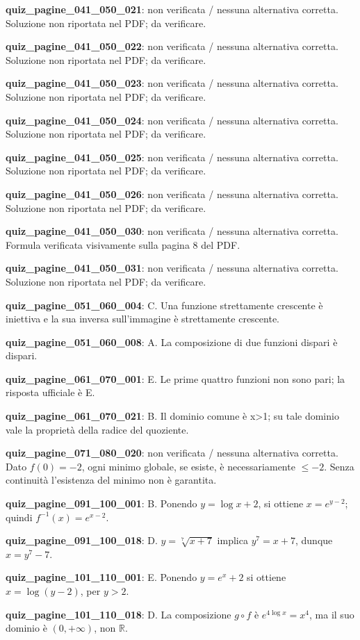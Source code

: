 \documentclass[11pt,a4paper]{article}
\newcounter{quiz}
\begin{document}
\noindent\textbf{quiz\_pagine\_041\_050\_021}: non verificata / nessuna alternativa corretta. Soluzione non riportata nel PDF; da verificare.\par\medskip
\noindent\textbf{quiz\_pagine\_041\_050\_022}: non verificata / nessuna alternativa corretta. Soluzione non riportata nel PDF; da verificare.\par\medskip
\noindent\textbf{quiz\_pagine\_041\_050\_023}: non verificata / nessuna alternativa corretta. Soluzione non riportata nel PDF; da verificare.\par\medskip
\noindent\textbf{quiz\_pagine\_041\_050\_024}: non verificata / nessuna alternativa corretta. Soluzione non riportata nel PDF; da verificare.\par\medskip
\noindent\textbf{quiz\_pagine\_041\_050\_025}: non verificata / nessuna alternativa corretta. Soluzione non riportata nel PDF; da verificare.\par\medskip
\noindent\textbf{quiz\_pagine\_041\_050\_026}: non verificata / nessuna alternativa corretta. Soluzione non riportata nel PDF; da verificare.\par\medskip
\noindent\textbf{quiz\_pagine\_041\_050\_030}: non verificata / nessuna alternativa corretta. Formula verificata visivamente sulla pagina 8 del PDF.\par\medskip
\noindent\textbf{quiz\_pagine\_041\_050\_031}: non verificata / nessuna alternativa corretta. Soluzione non riportata nel PDF; da verificare.\par\medskip
\noindent\textbf{quiz\_pagine\_051\_060\_004}: C. Una funzione strettamente crescente è iniettiva e la sua inversa sull’immagine è strettamente crescente.\par\medskip
\noindent\textbf{quiz\_pagine\_051\_060\_008}: A. La composizione di due funzioni dispari è dispari.\par\medskip
\noindent\textbf{quiz\_pagine\_061\_070\_001}: E. Le prime quattro funzioni non sono pari; la risposta ufficiale è E.\par\medskip
\noindent\textbf{quiz\_pagine\_061\_070\_021}: B. Il dominio comune è x>1; su tale dominio vale la proprietà della radice del quoziente.\par\medskip
\noindent\textbf{quiz\_pagine\_071\_080\_020}: non verificata / nessuna alternativa corretta. Dato $f(0)=-2$, ogni minimo globale, se esiste, è necessariamente $\le-2$. Senza continuità l'esistenza del minimo non è garantita.\par\medskip
\noindent\textbf{quiz\_pagine\_091\_100\_001}: B. Ponendo $y=\log x+2$, si ottiene $x=e^{y-2}$; quindi $f^{-1}(x)=e^{x-2}$.\par\medskip
\noindent\textbf{quiz\_pagine\_091\_100\_018}: D. $y=\sqrt[7]{x+7}$ implica $y^7=x+7$, dunque $x=y^7-7$.\par\medskip
\noindent\textbf{quiz\_pagine\_101\_110\_001}: E. Ponendo $y=e^x+2$ si ottiene $x=\log(y-2)$, per $y>2$.\par\medskip
\noindent\textbf{quiz\_pagine\_101\_110\_018}: D. La composizione $g\circ f$ è $e^{4\log x}=x^4$, ma il suo dominio è $(0,+\infty)$, non $\mathbb R$.\par\medskip
\end{document}
